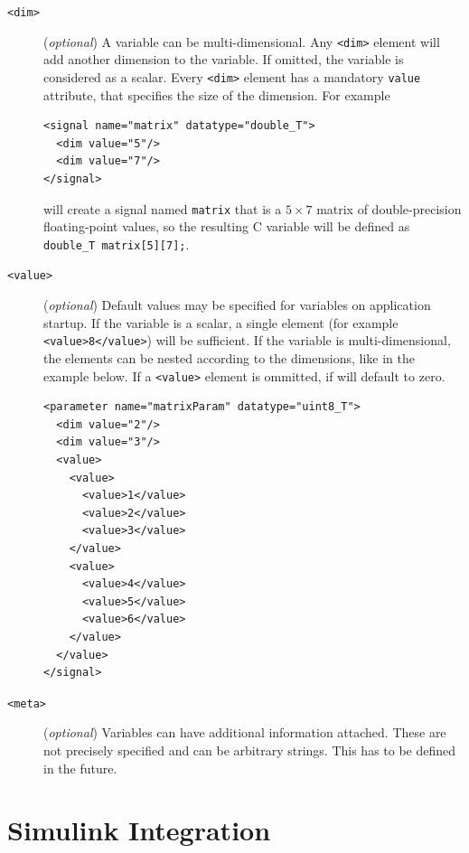 \begin{description}

\item[\small\texttt{<dim>}] (\textit{optional}) A variable can be
multi-dimensional. Any \texttt{<dim>} element will add another dimension to the
variable. If omitted, the variable is considered as a scalar. Every
\texttt{<dim>} element has a mandatory \texttt{value} attribute, that specifies
the size of the dimension. For example

\begin{lstlisting}
<signal name="matrix" datatype="double_T">
  <dim value="5"/>
  <dim value="7"/>
</signal>
\end{lstlisting}

will create a signal named \texttt{matrix} that is a $5\times7$ matrix of
double-precision floating-point values, so the resulting C variable will be
defined as \lstinline{double_T matrix[5][7];}.

\item[\small\texttt{<value>}] (\textit{optional}) Default values may be
specified for variables on application startup. If the variable is a scalar, a
single element (for example \lstinline+<value>8</value>+) will be sufficient.
If the variable is multi-dimensional, the elements can be nested according to
the dimensions, like in the example below. If a \texttt{<value>} element is
ommitted, if will default to zero.

\begin{lstlisting}
<parameter name="matrixParam" datatype="uint8_T">
  <dim value="2"/>
  <dim value="3"/>
  <value>
    <value>
      <value>1</value>
      <value>2</value>
      <value>3</value>
    </value>
    <value>
      <value>4</value>
      <value>5</value>
      <value>6</value>
    </value>
  </value>
</signal>
\end{lstlisting}

\item[\small\texttt{<meta>}] (\textit{optional}) Variables can have additional
information attached. These are not precisely specified and can be arbitrary
strings. This has to be defined in the future.

\end{description}


\chapter{Simulink Integration}
\label{sec:simulink}

